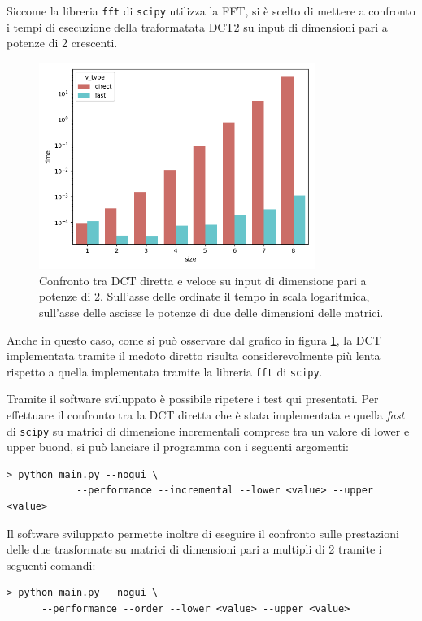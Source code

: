 \documentclass[a4paper, 12pt]{article}
\begin{document}
Siccome la libreria \texttt{fft} di \texttt{scipy} utilizza la FFT, si è scelto
di mettere a confronto i tempi di esecuzione della traformatata DCT2 su input di
dimensioni pari a potenze di 2 crescenti.

\begin{figure}[H]
	\centering
	\includegraphics[width=0.8\textwidth]{../test/benchmark-results/bench-order-0.png}
	\caption{Confronto tra DCT diretta e veloce su input di dimensione pari a
		potenze di 2. Sull'asse delle ordinate il tempo in scala logaritmica,
		sull'asse delle ascisse le potenze di due delle dimensioni delle matrici.}
	\label{fig:order-benchmark}
\end{figure}

Anche in questo caso, come si può osservare dal grafico in figura
\ref{fig:order-benchmark}, la DCT implementata tramite il medoto diretto risulta
considerevolmente più lenta rispetto a quella implementata tramite la libreria
\texttt{fft} di \texttt{scipy}.

Tramite il software sviluppato è possibile ripetere i test qui presentati. Per
effettuare il confronto tra la DCT diretta che è stata implementata e quella
\textit{fast} di \texttt{scipy} su matrici di dimensione incrementali comprese
tra un valore di lower e upper buond, si può lanciare il programma con i
seguenti argomenti:
\vspace{12pt}
\begin{lstlisting}[frame=single]
 > python main.py --nogui \
			--performance --incremental --lower <value> --upper <value>
\end{lstlisting}

Il software sviluppato permette inoltre di eseguire il confronto sulle
prestazioni delle due trasformate su matrici di dimensioni pari a multipli di 2
tramite i seguenti comandi:
\vspace{12pt}
\begin{lstlisting}[frame=single]
 > python main.py --nogui \
      --performance --order --lower <value> --upper <value>
\end{lstlisting}
\end{document}
